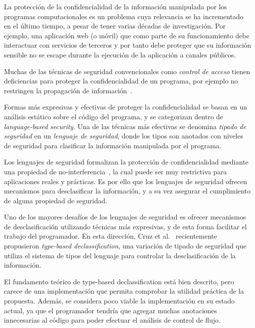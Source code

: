 \begin{intro}

	La protección de la confidencialidad de la información manipulada por los programas computacionales es un problema cuya relevancia se ha incrementado en el último tiempo, a pesar de tener varias décadas de investigación. Por ejemplo, una aplicación web (o móvil) que como parte de su funcionamiento debe interactuar con servicios de terceros y por tanto debe proteger que su información sensible no se escape durante la ejecución de la aplicación a canales públicos.

	Muchas de las técnicas de seguridad convencionales como \textit{control de acceso} tienen deficiencias para proteger la confidencialidad de un programa, por ejemplo no restringen la propagación de información~\cite{myers-phd}.

	Formas más expresivas y efectivas de proteger la confidencialidad se basan en un análisis estático sobre el código del programa, y se categorizan dentro de \textit{language-based security}. Una de las técnicas más efectivas se denomina \textit{tipado de seguridad} en un \textit{lenguaje de seguridad}, donde los tipos son anotados con niveles de seguridad para clasificar la información manipulada por el programa.

	Los lenguajes de seguridad formalizan la protección de confidencialidad mediante una propiedad de no-interferencia~\cite{noninterference}, la cual puede ser muy restrictiva para aplicaciones reales y prácticas. Es por ello que los lenguajes de seguridad ofrecen mecanismos para desclasificar la información, y a su vez asegurar el cumplimiento de alguna propiedad de seguridad.

	Uno de los mayores desafíos de los lenguajes de seguridad es ofrecer mecanismos de desclasificación utilizando técnicas más expresivas, y de esta forma facilitar el trabajo del programador. En esta dirección, Cruz et al.~\cite{cruzAl:ecoop2017} recientemente propusieron \emph{type-based declassification}, una variación de tipado de seguridad que utiliza el sistema de tipos del lenguaje para controlar la desclasificación de la información.

	El fundamento teórico de type-based declassification está bien descrito, pero carece de una implementación que permita comprobar la utilidad práctica de la propuesta. Además, se considera poco viable la implementación en su estado actual, ya que el programador tendría que agregar muchas anotaciones innecesarias al código para poder efectuar el análisis de control de flujo.


\end{intro}
